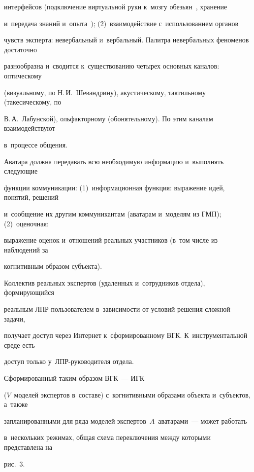 интерфейсов (подключение виртуальной руки к~мозгу обезь\-ян~\cite{11-rum}, хранение 


и~передача знаний и~опыта~\cite{12-rum}); (2)~взаимодействие с~использованием органов 


чувств эксперта: невербальный и~вербальный. Палитра невербальных феноменов достаточно 


разнообразна и~сводится к~существованию четырех основных каналов: оптическому 


(визуальному, по Н.\,И.~Шевандрину), акустическому, тактильному (такесическому, по 


В.\,А.~Лабунской), ольфакторному (обонятельному). По этим каналам взаимодействуют 


в~процессе общения.


  


  Аватара должна передавать всю необходимую информацию и~выполнять следующие 


функции коммуникации: (1)~информационная функция: выражение идей, понятий, решений 


и~сообщение их другим коммуникантам (аватарам и~моделям из ГМП); (2)~оценочная: 


выражение оценок и~отношений реальных участников (в~том числе из наблюдений за 


когнитивным образом субъекта).


  


  Коллектив реальных экспертов (удаленных и~сотрудников отдела), формирующийся 


реальным ЛПР-поль\-зо\-ва\-те\-лем в~зависимости от условий решения сложной задачи, 


получает доступ через Интернет к~сформированному ВГК. К~инструментальной среде есть 


доступ только у~ЛПР-ру\-ко\-во\-ди\-те\-ля отдела.


  


  Сформированный таким образом ВГК~--- ИГК 


($V$~моделей экспертов в~составе) с~когнитивными образами объекта и~субъектов, а~также 


запланированными для ряда моделей экспертов~$A$~аватарами~--- может работать 


в~нескольких режимах, общая схема переключения между которыми представлена на 


рис.~3. 


